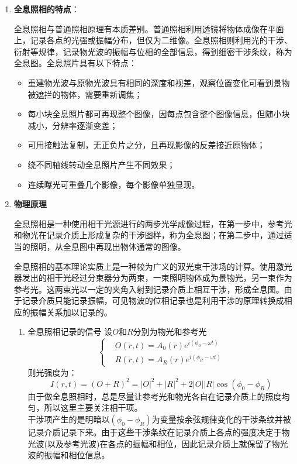 \documentclass[dvipsnames, svgnames,a4paper,11pt]{article}
\begin{document}
	\begin{enumerate}
		\item \textbf{全息照相的特点}：
		
			全息照相与普通照相原理有本质差别。普通照相利用透镜将物体成像在平面上，记录各点的光强或振幅分布，但仅为二维像。全息照相则利用光的干涉、衍射等规律，记录物光波的振幅与位相的全部信息，得到细密干涉条纹，称为全息图。全息照片具有以下特点：
			\begin{itemize}
				\item 重建物光波与原物光波具有相同的深度和视差，观察位置变化可看到景物被遮拦的物体，需要重新调焦；
				
				\item 每小块全息照片都可再现整个图像，因每点包含整个图像信息，但随小块减小，分辨率逐渐变差；
				
				\item 可用接触法复制，无正负片之分，且再现影像的反差接近原物体；
				
				\item 绕不同轴线转动全息照片产生不同效果；
				
				\item 连续曝光可重叠几个影像，每个影像单独显现。
			\end{itemize}
		\item \textbf{物理原理}
			
			全息照相是一种使用相干光源进行的两步光学成像过程，在第一步中，参考光和物光在记录介质上形成复杂的干涉图样，称为全息图；在第二步中，通过适当的照明，从全息图中再现出物体通常的图像。
			
			全息照相的基本理论实质上是一种较为广义的双光束干涉场的计算。使用激光器发出的相干光经过分束器分为两束，一束照明物体成为景物光，另一束作为参考光。这两束光以一定的夹角入射到记录介质上相互干涉，形成全息图。由于记录介质只能记录振幅，可见物波的位相记录也是利用干涉的原理转换成相应的振幅关系加以记录的。
			
				\begin{enumerate}[label=\roman*.]
					\item 全息照相记录的信号
						设$O$和$R$分别为物光和参考光
						\[
						\left\{
						\begin{aligned}
							& O(r,t)=A_0(r)e^{i(\phi_0-\omega t)}\\
							& R(r,t)=A_R(r)e^{i(\phi_R-\omega t)}
						\end{aligned}
						\right.
						\]
						则光强度为：
						\[
						I(r,t)=(O+R)^2=\left| O \right|^2+\left| R \right|^2+2\left| O \right|\left| R \right|\cos(\phi_0-\phi_R)
						\]
						由于做全息照相时，总是尽量让参考光和物光各自在记录介质上的照度均匀，所以这里主要关注相干项。\\
						干涉项产生的是明暗以$(\phi_0-\phi_R)$为变量按余弦规律变化的干涉条纹并被记录介质记录下来。由于这些干涉条纹在记录介质上各点的强度决定于物光波(以及参考光波)在各点的振幅和相位，因此记录介质上就保留了物光波的振幅和相位信息。


\end{enumerate}
\end{enumerate}
\end{document}
